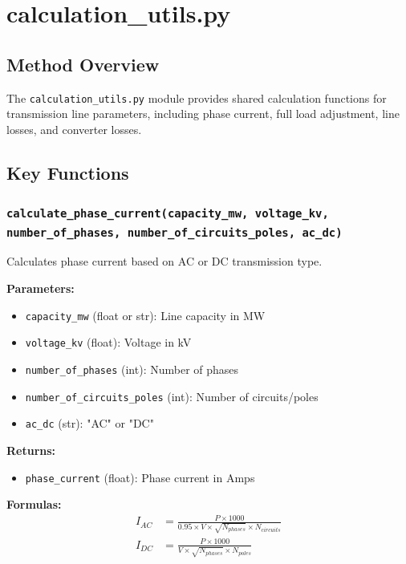 \documentclass[ctcc_full_documentation.tex]{subfiles}
\begin{document}
\section{calculation\_utils.py}

\subsection{Method Overview}

The \texttt{calculation\_utils.py} module provides shared calculation functions for transmission line parameters, including phase current, full load adjustment, line losses, and converter losses.

\subsection{Key Functions}

\subsubsection{\texttt{calculate\_phase\_current(capacity\_mw, voltage\_kv, number\_of\_phases, number\_of\_circuits\_poles, ac\_dc)}}

Calculates phase current based on AC or DC transmission type.

\textbf{Parameters:}
\begin{itemize}
    \item \texttt{capacity\_mw} (float or str): Line capacity in MW
    \item \texttt{voltage\_kv} (float): Voltage in kV
    \item \texttt{number\_of\_phases} (int): Number of phases
    \item \texttt{number\_of\_circuits\_poles} (int): Number of circuits/poles
    \item \texttt{ac\_dc} (str): "AC" or "DC"
\end{itemize}

\textbf{Returns:}
\begin{itemize}
    \item \texttt{phase\_current} (float): Phase current in Amps
\end{itemize}

\textbf{Formulas:}
\begin{align}
I_{AC} &= \frac{P \times 1000}{0.95 \times V \times \sqrt{N_{phases}} \times N_{circuits}} \\
I_{DC} &= \frac{P \times 1000}{V \times \sqrt{N_{phases}} \times N_{poles}}
\end{align}
\end{document}
